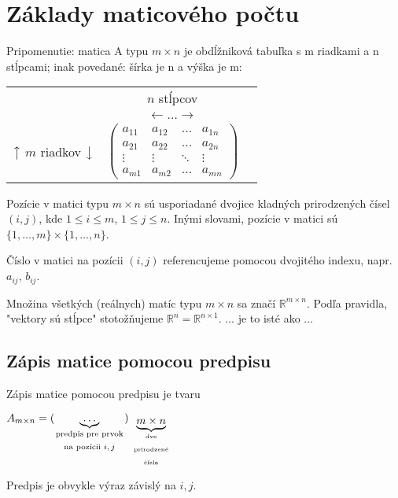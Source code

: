 \section{Základy maticového počtu}

Pripomenutie: matica A typu $m \times n$ je obdĺžniková tabuľka s m riadkami a n stĺpcami; inak povedané: šírka je n a výška je m:

\begin{center}
\begin{tabular}{ccc}
 & \hspace{-2em} $n$ stĺpcov \\
 & \hspace{-2em} $\longleftarrow \dots \longrightarrow$ \\
\parbox{6em}{\centering $\big\uparrow$\\$m$ riadkov \\$\big\downarrow$}&
  $\begin{pmatrix}
    a_{11} & a_{12} & \dots & a_{1n} \\
    a_{21} & a_{22} & \dots & a_{2n} \\
    \vdots & \vdots & \ddots & \vdots \\
    a_{m1} & a_{m2} & \dots & a_{mn}
  \end{pmatrix}$ 
\end{tabular}
\end{center}
\vspace{1em}

Pozície v matici typu $m \times n$ sú usporiadané dvojice kladných prirodzených čísel $(i, j)$, kde $1 \le i \le m$, $1 \le j \le n$. Inými slovami, pozície v matici sú $\{1, \dots, m\} \times \{1, \dots, n\}$.

Číslo v matici na pozícii $(i, j)$ referencujeme pomocou dvojitého indexu, napr. $a_{ij}$, $b_{ij}$.

Množina všetkých (reálnych) matíc typu $m \times n$ sa značí $\mathbb{R}^{m \times n}$. Podľa pravidla, "vektory sú stĺpce" stotožňujeme $\mathbb{R}^n = \mathbb{R}^{n \times 1}$.
... je to isté ako ...

\subsection{Zápis matice pomocou predpisu}
Zápis matice pomocou predpisu je tvaru
\begin{center}
$A_{m \times n} = (\underbrace{\dots}_{\text{\parbox{8em}{\centering predpis pre prvok na pozícii
$i,j$}}})_{\underbrace{m \times n}_{\text{\parbox{6em}{\centering dve prirodzené čísla}}}}$
\end{center}
Predpis je obvykle výraz závislý na $i, j$.

